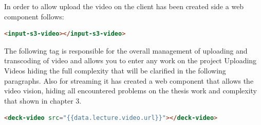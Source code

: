In order to allow upload the video on the client has been created side a web component follows:

\begin{lstlisting}[language=html]
      <input-s3-video></input-s3-video>
\end{lstlisting}

The following tag is responsible for the overall management of uploading and transcoding of video and allows you to enter any work on the project Uploading Videos hiding the full complexity that will be clarified in the following paragraphs.
Also for streaming it has created a web component that allows the video vision, hiding all  encountered problems on the thesis work and complexity that shown in chapter 3.

\begin{lstlisting}[language=html]
       <deck-video src="{{data.lecture.video.url}}"></deck-video>
\end{lstlisting}